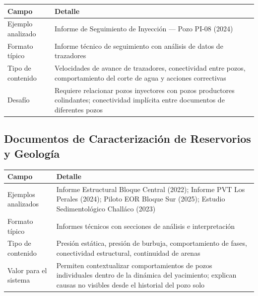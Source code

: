 \documentclass[12pt, a4paper]{article}
\begin{document}
\begin{tabularx}{\textwidth}{BL}
  \toprule
  \textbf{Campo} & \textbf{Detalle} \\
  \midrule
  Ejemplo analizado   & Informe de Seguimiento de Inyecci\'{o}n --- Pozo PI-08 (2024) \\
  \addlinespace
  Formato t\'{i}pico  & Informe t\'{e}cnico de seguimiento con an\'{a}lisis de datos de
                        trazadores \\
  \addlinespace
  Tipo de contenido   & Velocidades de avance de trazadores, conectividad entre pozos,
                        comportamiento del corte de agua y acciones correctivas \\
  \addlinespace
  Desaf\'{i}o         & Requiere relacionar pozos inyectores con pozos productores
                        colindantes; conectividad impl\'{i}cita entre documentos de diferentes
                        pozos \\
  \bottomrule
\end{tabularx}

\subsection{Documentos de Caracterizaci\'{o}n de Reservorios y Geolog\'{i}a}

\begin{tabularx}{\textwidth}{BL}
  \toprule
  \textbf{Campo} & \textbf{Detalle} \\
  \midrule
  Ejemplos analizados & Informe Estructural Bloque Central (2022); Informe PVT Los Perales
                        (2024); Piloto EOR Bloque Sur (2025); Estudio Sedimentol\'{o}gico
                        Chall\'{a}co (2023) \\
  \addlinespace
  Formato t\'{i}pico  & Informes t\'{e}cnicos con secciones de an\'{a}lisis e interpretaci\'{o}n \\
  \addlinespace
  Tipo de contenido   & Presi\'{o}n est\'{a}tica, presi\'{o}n de burbuja, comportamiento de
                        fases, conectividad estructural, continuidad de arenas \\
  \addlinespace
  Valor para el sistema & Permiten contextualizar comportamientos de pozos individuales
                          dentro de la din\'{a}mica del yacimiento; explican causas no visibles
                          desde el historial del pozo solo \\
  \bottomrule
\end{tabularx}
\end{document}
